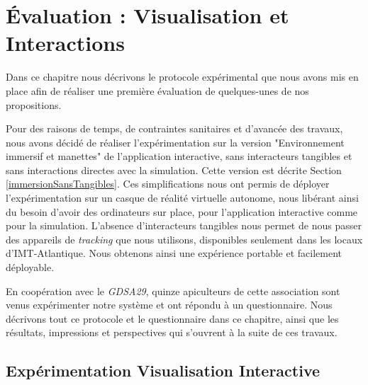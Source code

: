 \chapter{Évaluation : Visualisation et Interactions}
\label{ChapitreEvalVR}

	Dans ce chapitre nous décrivons le protocole expérimental que nous avons mis en place afin de réaliser une première évaluation de quelques-unes de nos propositions.
	
	Pour des raisons de temps, de contraintes sanitaires et d'avancée des travaux, nous avons décidé de réaliser l'expérimentation sur la version "Environnement immersif et manettes" de l'application interactive, sans interacteurs tangibles et sans interactions directes avec la simulation. Cette version est décrite Section \ref{immersionSansTangibles}. Ces simplifications nous ont permis de déployer l'expérimentation sur un casque de réalité virtuelle autonome, nous libérant ainsi du besoin d'avoir des ordinateurs sur place, pour l'application interactive comme pour la simulation. L'absence d'interacteurs tangibles nous permet de nous passer des appareils de \textit{tracking} que nous utilisons, disponibles seulement dans les locaux d'IMT-Atlantique. Nous obtenons ainsi une expérience portable et facilement déployable.
	
	En coopération avec le \textit{GDSA29}, quinze apiculteurs de cette association sont venus expérimenter notre système et ont répondu à un questionnaire. Nous décrivons tout ce protocole et le questionnaire dans ce chapitre, ainsi que les résultats, impressions et perspectives qui s'ouvrent à la suite de ces travaux.

	\section{Expérimentation Visualisation Interactive}
		\label{sectionExpe}
		
